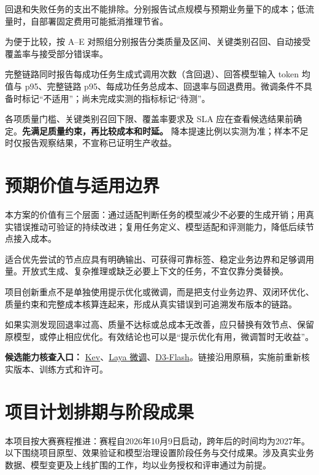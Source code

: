 \documentclass[UTF8,a4paper,11pt,fontset=windows]{ctexart}
\begin{document}
回退和失败任务的支出不能排除。分别报告试点规模与预期业务量下的成本；低流量时，自部署固定费用可能抵消推理节省。


为便于比较，按 A–E 对照组分别报告分类质量及区间、关键类别召回、自动接受覆盖率与接受部分错误率。

\pagebreak
完整链路同时报告每成功任务生成式调用次数（含回退）、回答模型输入 token 均值与 p95、完整链路 p95、每成功任务总成本、回退率与回退费用。微调条件不具备时标记“不适用”；尚未完成实测的指标标记“待测”。




各项质量门槛、关键类别召回下限、覆盖率要求及 SLA 应在查看候选结果前确定。\textbf{先满足质量约束，再比较成本和时延。} 降本提速比例以实测为准；样本不足时仅报告观察结果，不宣称已证明生产收益。


\section{预期价值与适用边界}

本方案的价值有三个层面：通过适配判断任务的模型减少不必要的生成开销；用真实错误推动可验证的持续改进；复用任务定义、模型适配和评测能力，降低后续节点接入成本。


适合优先尝试的节点应具有明确输出、可获得可靠标签、稳定业务边界和足够调用量。开放式生成、复杂推理或缺乏必要上下文的任务，不宜仅靠分类替换。


项目创新重点不是单独使用提示优化或微调，而是把支付业务边界、双闭环优化、质量约束和完整成本核算连起来，形成从真实错误到可追溯发布版本的链路。


如果实测发现回退率过高、质量不达标或总成本无改善，应只替换有效节点、保留原模型，或停止相应优化。有效结论也可以是“提示优化有用，微调暂时无收益”。


\textbf{候选能力核查入口：} \href{https://github.com/jaredpalmer/kev}{Kev}、\href{https://github.com/NandhaKishorM/laya/blob/main/docs/finetune.md}{Laya 微调}、\href{https://huggingface.co/vllm-sr/d3-flash}{D3-Flash}。链接沿用原稿，实施前重新核实版本、训练方式和许可。


\section{项目计划排期与阶段成果}

本项目按大赛赛程推进：赛程自2026年10月9日启动，跨年后的时间均为2027年。以下围绕项目原型、效果验证和模型治理设置阶段任务与交付成果。涉及真实业务数据、模型变更及上线扩围的工作，均以业务授权和评审通过为前提。
\end{document}
